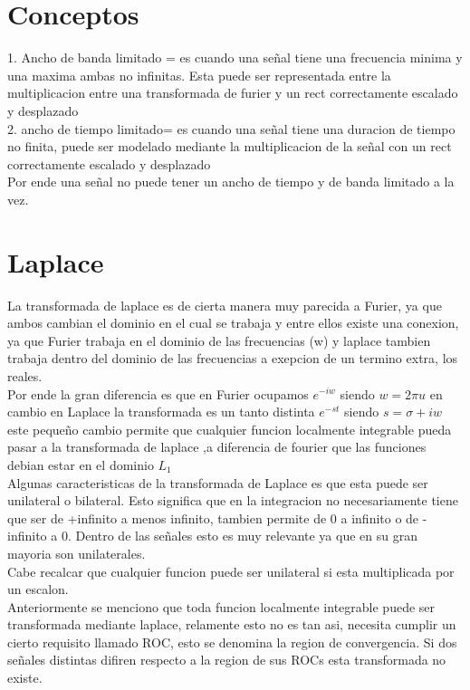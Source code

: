 \section{Conceptos}
1. Ancho de banda limitado = es cuando una señal tiene una frecuencia minima y una maxima ambas no infinitas. Esta puede ser representada entre la multiplicacion entre una transformada de furier y un rect correctamente escalado y desplazado \\
2. ancho de tiempo limitado= es cuando una señal tiene una duracion de tiempo no finita, puede ser modelado mediante la multiplicacion de la señal con un rect correctamente escalado y desplazado \\
Por ende una señal no puede tener un ancho de tiempo y de banda limitado a la vez.\\
\newpage
\section{Laplace}
 La transformada de laplace es de cierta manera muy parecida a Furier, ya que ambos cambian el dominio en el cual se trabaja y entre ellos existe una conexion, ya que Furier trabaja en el dominio de las frecuencias (w) y laplace tambien trabaja dentro del dominio de las frecuencias a exepcion de un termino extra, los reales.\\
Por ende la gran diferencia es que en Furier ocupamos $e^{-iw}$ siendo $w=2\pi u$ en cambio en Laplace la transformada es un tanto distinta $e^{-st}$ siendo $s= \sigma +iw$ 
este pequeño cambio permite que cualquier funcion localmente integrable pueda pasar a la transformada de laplace ,a diferencia de fourier que las funciones debian estar en el dominio $L_1$\\
Algunas caracteristicas de la transformada de Laplace es que esta puede ser unilateral o bilateral. Esto significa que en la integracion no necesariamente tiene que ser de +infinito a menos infinito, tambien permite de 0 a infinito o de - infinito a 0. Dentro de las señales esto es muy relevante ya que en su gran mayoria son unilaterales. \\
Cabe recalcar que cualquier funcion puede ser unilateral si esta multiplicada por un escalon.
\\
Anteriormente se menciono que toda funcion localmente integrable puede ser transformada mediante laplace, relamente esto no es tan asi, necesita cumplir un cierto requisito llamado ROC, esto se denomina la region de convergencia. Si dos señales distintas difiren respecto a la region de sus ROCs esta transformada no existe.
